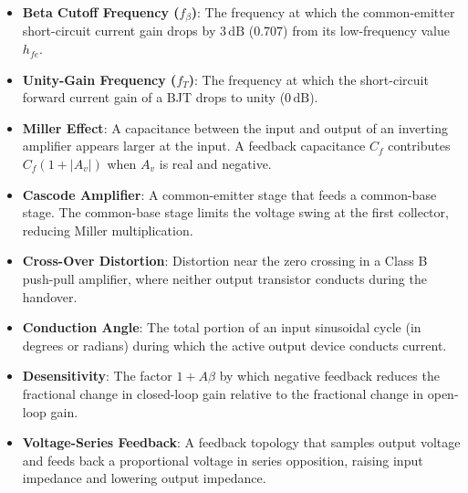 \documentclass[12pt,a4paper]{article}
\begin{document}
\begin{tcolorbox}[defbox, title={One-Line Definitions}, title after break={One-Line Definitions (contd.)}]
\small
{}
\begin{itemize}[leftmargin=1.5em, topsep=2pt, itemsep=4pt]
  \item \textbf{Beta Cutoff Frequency ($f_\beta$)}: The frequency at which the common-emitter short-circuit current gain drops by $3\,\mathrm{dB}$ ($0.707$) from its low-frequency value $h_{fe}$.
  \item \textbf{Unity-Gain Frequency ($f_T$)}: The frequency at which the short-circuit forward current gain of a BJT drops to unity ($0\,\mathrm{dB}$).
  \item \textbf{Miller Effect}: A capacitance between the input and output of an inverting amplifier appears larger at the input. A feedback capacitance $C_f$ contributes $C_f(1+|A_v|)$ when $A_v$ is real and negative.
  \item \textbf{Cascode Amplifier}: A common-emitter stage that feeds a common-base stage. The common-base stage limits the voltage swing at the first collector, reducing Miller multiplication.
  \item \textbf{Cross-Over Distortion}: Distortion near the zero crossing in a Class B push-pull amplifier, where neither output transistor conducts during the handover.
  \item \textbf{Conduction Angle}: The total portion of an input sinusoidal cycle (in degrees or radians) during which the active output device conducts current.
  \item \textbf{Desensitivity}: The factor $1+A\beta$ by which negative feedback reduces the fractional change in closed-loop gain relative to the fractional change in open-loop gain.
  \item \textbf{Voltage-Series Feedback}: A feedback topology that samples output voltage and feeds back a proportional voltage in series opposition, raising input impedance and lowering output impedance.
\end{itemize}
\end{tcolorbox}
\end{document}
